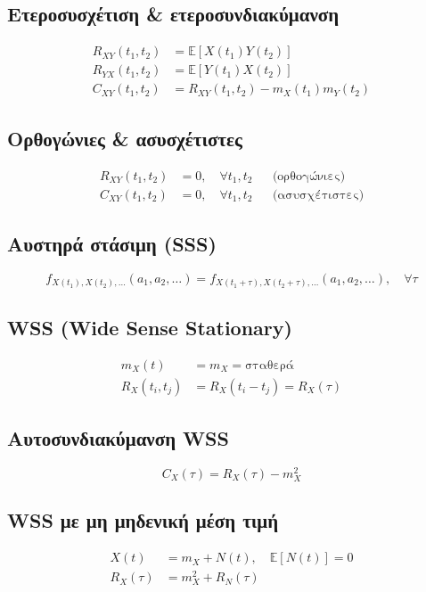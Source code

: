 \documentclass[11pt,a4paper]{article}
\newcommand{\E}{\mathbb{E}}
\begin{document}
\subsection{Ετεροσυσχέτιση \& ετεροσυνδιακύμανση}
\begin{align}
R_{XY}(t_1,t_2) &= \E[X(t_1)Y(t_2)] \\
R_{YX}(t_1,t_2) &= \E[Y(t_1)X(t_2)] \\
C_{XY}(t_1,t_2) &= R_{XY}(t_1,t_2) - m_X(t_1)m_Y(t_2)
\end{align}

\subsection{Ορθογώνιες \& ασυσχέτιστες}
\begin{align}
R_{XY}(t_1,t_2) &= 0, \quad \forall t_1,t_2 && \text{(ορθογώνιες)} \\
C_{XY}(t_1,t_2) &= 0, \quad \forall t_1,t_2 && \text{(ασυσχέτιστες)}
\end{align}

\subsection{Αυστηρά στάσιμη (SSS)}
\begin{equation}
f_{X(t_1),X(t_2),\ldots}(a_1,a_2,\ldots)
= f_{X(t_1+\tau),X(t_2+\tau),\ldots}(a_1,a_2,\ldots), \quad \forall\tau
\end{equation}

\subsection{WSS (Wide Sense Stationary)}
\begin{align}
m_X(t) &= m_X = \text{σταθερά} \\
R_X(t_i,t_j) &= R_X(t_i - t_j) = R_X(\tau)
\end{align}

\subsection{Αυτοσυνδιακύμανση WSS}
\begin{equation}
C_X(\tau) = R_X(\tau) - m_X^2
\end{equation}

\subsection{WSS με μη μηδενική μέση τιμή}
\begin{align}
X(t) &= m_X + N(t), \quad \E[N(t)] = 0 \\
R_X(\tau) &= m_X^2 + R_N(\tau)
\end{align}
\end{document}
